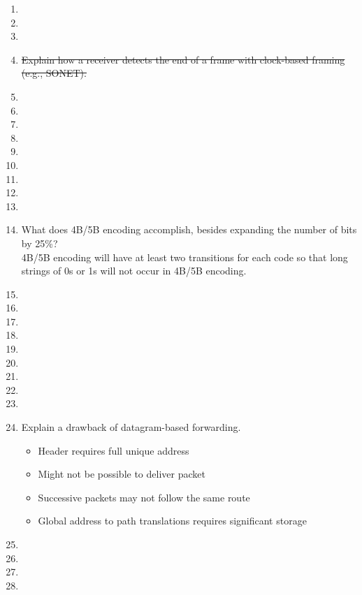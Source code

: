 \documentclass[10pt, a4paper]{article}
\begin{document}
\begin{enumerate}
\item\mbox{}
\item\mbox{}
\item\mbox{}
\item\mbox{} \sout{Explain how a receiver detects the end of a frame with clock-based framing (e.g., SONET).}
\item\mbox{}
\item\mbox{}
\item\mbox{}
\item\mbox{}
\item\mbox{}
\item\mbox{}
\item\mbox{}
\item\mbox{}
\item\mbox{}
\item\mbox{} What does 4B/5B encoding accomplish, besides expanding the number of bits by 25\%?\\
    \color{blue}
    4B/5B encoding will have at least two transitions for each code so that long strings of 0s or 1s will not occur in 4B/5B encoding.
    \color{black}
\item\mbox{}
\item\mbox{}
\item\mbox{}
\item\mbox{}
\item\mbox{}
\item\mbox{}
\item\mbox{}
\item\mbox{}
\item\mbox{}
\item\mbox{} Explain a drawback of datagram-based forwarding.
    \color{blue}
    \begin{itemize}
    \item Header requires full unique address
    \item Might not be possible to deliver packet
    \item Successive packets may not follow the same route
    \item Global address to path translations requires significant storage
    \end{itemize}
    \color{black}
\item\mbox{}
\item\mbox{}
\item\mbox{}
\item\mbox{}

\end{enumerate}
\end{document}
